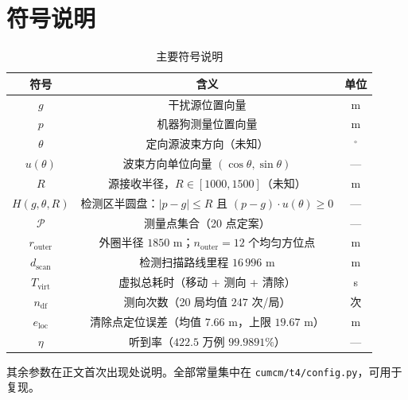 \section{符号说明}

\begin{table}[H]
  \centering
  \caption{主要符号说明}
  \begin{tabular}{ccc}
    \toprule
    \textbf{符号} & \textbf{含义} & \textbf{单位} \\
    \midrule
    $g$                  & 干扰源位置向量 & m \\
    $p$                  & 机器狗测量位置向量 & m \\
    $\theta$             & 定向源波束方向（未知） & $^\circ$ \\
    $u(\theta)$          & 波束方向单位向量 $(\cos\theta,\sin\theta)$ & --- \\
    $R$                  & 源接收半径，$R\in[1000,1500]$（未知） & m \\
    $H(g,\theta,R)$      & 检测区半圆盘：$|p-g|\le R$ 且 $(p-g)\cdot u(\theta)\ge 0$ & --- \\
    $\mathcal{P}$        & 测量点集合（20 点定案） & --- \\
    $r_{\mathrm{outer}}$ & 外圈半径 $1850$ m；$n_{\mathrm{outer}}=12$ 个均匀方位点 & m \\
    $d_{\mathrm{scan}}$  & 检测扫描路线里程 $16\,996$ m & m \\
    $T_{\mathrm{virt}}$  & 虚拟总耗时（移动 + 测向 + 清除） & s \\
    $n_{\mathrm{df}}$    & 测向次数（20 局均值 $247$ 次/局） & 次 \\
    $e_{\mathrm{loc}}$   & 清除点定位误差（均值 $7.66$ m，上限 $19.67$ m） & m \\
    $\eta$               & 听到率（$422.5$ 万例 $99.9891\%$） & --- \\
    \bottomrule
  \end{tabular}
\end{table}

其余参数在正文首次出现处说明。全部常量集中在 \texttt{cumcm/t4/config.py}，可用于复现。
